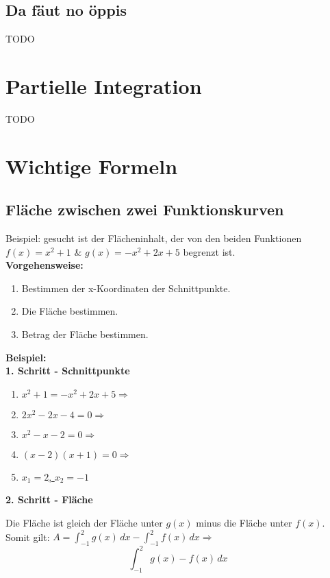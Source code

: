 \documentclass[12pt]{scrartcl}
\begin{document}
\subsection{Da fäut no öppis}
TODO

\newpage
\section{Partielle Integration}
TODO


\newpage
\section{Wichtige Formeln}
\subsection{Fläche zwischen zwei Funktionskurven}
Beispiel: gesucht ist der Flächeninhalt, der von den beiden Funktionen $f(x) = x^2 + 1$ & $g(x) = -x^2 + 2x + 5$
begrenzt ist.\\


\textbf{Vorgehensweise:}
\begin{enumerate}
    \item Bestimmen der x-Koordinaten der Schnittpunkte.
    \item Die Fläche bestimmen.
    \item Betrag der Fläche bestimmen.
\end{enumerate}

\hfill \break

\textbf{Beispiel:}\\
\textbf{1. Schritt - Schnittpunkte}
\begin{enumerate}
    \item $x^2 + 1 = -x^2 + 2x + 5 \Rightarrow$
    \item $2x^2 -2x -4 = 0 \Rightarrow $
    \item $x^2 - x - 2 = 0 \Rightarrow$
    \item $(x-2)(x+1) = 0 \Rightarrow$
    \item \underline{$x_1 = 2$, $x_2 = -1$}
\end{enumerate}

\hfill \break
\textbf{2. Schritt - Fläche}

Die Fläche ist gleich der Fläche unter $g(x)$ minus die Fläche unter $f(x)$.\\
Somit gilt:
$A = \int_{-1}^{2} g(x)\, dx - \int_{-1}^{2} f(x)\, dx \Rightarrow$
\[ \int_{-1}^{2} g(x) - f(x)\, dx \]




% 
\end{document}
